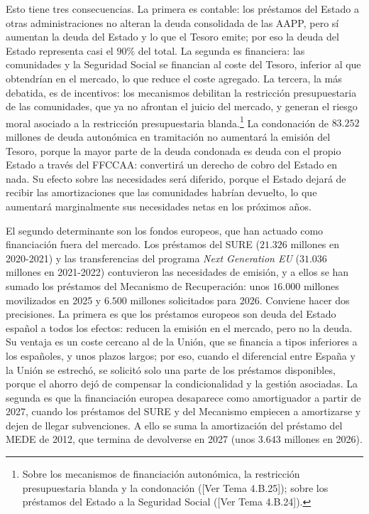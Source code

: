 \documentclass[10pt,a4paper]{article}
\newcommand{\authorfont}[1]{{\fontfamily{EBGaramond-TLF}\selectfont #1}}
\begin{document}
Esto tiene tres consecuencias. La primera es contable: los préstamos del Estado a otras administraciones no alteran la deuda consolidada de las AAPP, pero sí aumentan la deuda del Estado y lo que el Tesoro emite; por eso la deuda del Estado representa casi el $90\%$ del total. La segunda es financiera: las comunidades y la Seguridad Social se financian al coste del Tesoro, inferior al que obtendrían en el mercado, lo que reduce el coste agregado. La tercera, la más debatida, es de incentivos: los mecanismos debilitan la restricción presupuestaria de las comunidades, que ya no afrontan el juicio del mercado, y generan el riesgo moral asociado a la restricción presupuestaria blanda.\footnote{Sobre los mecanismos de financiación autonómica, la restricción presupuestaria blanda y la condonación ([\authorfont{Ver Tema 4.B.25}]); sobre los préstamos del Estado a la Seguridad Social ([\authorfont{Ver Tema 4.B.24}]).
} La condonación de $83.252$ millones de deuda autonómica en tramitación no aumentará la emisión del Tesoro, porque la mayor parte de la deuda condonada es deuda con el propio Estado a través del FFCCAA: convertirá un derecho de cobro del Estado en nada. Su efecto sobre las necesidades será diferido, porque el Estado dejará de recibir las amortizaciones que las comunidades habrían devuelto, lo que aumentará marginalmente sus necesidades netas en los próximos años.

El segundo determinante son los fondos europeos, que han actuado como financiación fuera del mercado. Los préstamos del SURE ($21.326$ millones en 2020-2021) y las transferencias del programa \textit{Next Generation EU} ($31.036$ millones en 2021-2022) contuvieron las necesidades de emisión, y a ellos se han sumado los préstamos del Mecanismo de Recuperación: unos $16.000$ millones movilizados en 2025 y $6.500$ millones solicitados para 2026. Conviene hacer dos precisiones. La primera es que los préstamos europeos son deuda del Estado español a todos los efectos: reducen la emisión en el mercado, pero no la deuda. Su ventaja es un coste cercano al de la Unión, que se financia a tipos inferiores a los españoles, y unos plazos largos; por eso, cuando el diferencial entre España y la Unión se estrechó, se solicitó solo una parte de los préstamos disponibles, porque el ahorro dejó de compensar la condicionalidad y la gestión asociadas. La segunda es que la financiación europea desaparece como amortiguador a partir de 2027, cuando los préstamos del SURE y del Mecanismo empiecen a amortizarse y dejen de llegar subvenciones. A ello se suma la amortización del préstamo del MEDE de 2012, que termina de devolverse en 2027 (unos $3.643$ millones en 2026).
\end{document}
